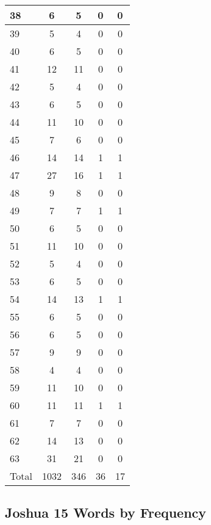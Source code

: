 \begin{center}
\begin{longtable}{l|c|c|c|c}
38 & 6 & 5 & 0 & 0\\ \hline
39 & 5 & 4 & 0 & 0\\ \hline
40 & 6 & 5 & 0 & 0\\ \hline
41 & 12 & 11 & 0 & 0\\ \hline
42 & 5 & 4 & 0 & 0\\ \hline
43 & 6 & 5 & 0 & 0\\ \hline
44 & 11 & 10 & 0 & 0\\ \hline
45 & 7 & 6 & 0 & 0\\ \hline
46 & 14 & 14 & 1 & 1\\ \hline
47 & 27 & 16 & 1 & 1\\ \hline
48 & 9 & 8 & 0 & 0\\ \hline
49 & 7 & 7 & 1 & 1\\ \hline
50 & 6 & 5 & 0 & 0\\ \hline
51 & 11 & 10 & 0 & 0\\ \hline
52 & 5 & 4 & 0 & 0\\ \hline
53 & 6 & 5 & 0 & 0\\ \hline
54 & 14 & 13 & 1 & 1\\ \hline
55 & 6 & 5 & 0 & 0\\ \hline
56 & 6 & 5 & 0 & 0\\ \hline
57 & 9 & 9 & 0 & 0\\ \hline
58 & 4 & 4 & 0 & 0\\ \hline
59 & 11 & 10 & 0 & 0\\ \hline
60 & 11 & 11 & 1 & 1\\ \hline
61 & 7 & 7 & 0 & 0\\ \hline
62 & 14 & 13 & 0 & 0\\ \hline
63 & 31 & 21 & 0 & 0\\ \hline
Total & 1032 & 346 & 36 & 17
\end{longtable}
\end{center}





\subsection{Joshua 15 Words by Frequency}


\normalsize
 
